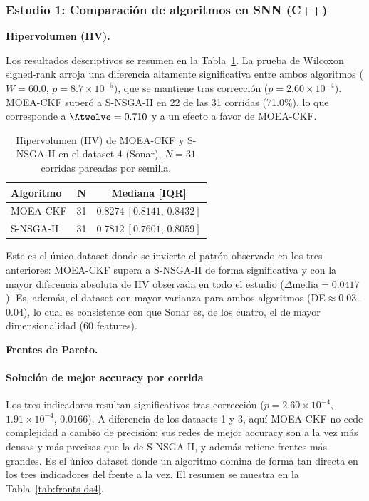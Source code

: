 \subsubsection{Estudio 1: Comparación de algoritmos en SNN (C++)}
\label{sec:ds4-estudio1}

\textbf{Hipervolumen (HV).}\label{sec:ds4-hv}

Los resultados descriptivos se resumen en la Tabla~\ref{tab:hv-ds4}. La prueba de Wilcoxon signed-rank arroja una diferencia altamente significativa entre ambos algoritmos ($W=60.0$, $p=8.7\times10^{-5}$), que se mantiene tras corrección ($p=2.60\times10^{-4}$). MOEA-CKF superó a S-NSGA-II en 22 de las 31 corridas (71.0\%), lo que corresponde a $\Atwelve=0.710$ y a un efecto a favor de MOEA-CKF.

\begin{table}[htbp]
\centering
\small
\caption{Hipervolumen (HV) de MOEA-CKF y S-NSGA-II en el dataset 4 (Sonar), $N=31$ corridas pareadas por semilla.}
\label{tab:hv-ds4}
\begin{tabular}{lcc}
\toprule
\textbf{Algoritmo} & \textbf{N} & \textbf{Mediana [IQR]} \\
\midrule
MOEA-CKF & 31 & $0.8274\ [0.8141,\,0.8432]$ \\
S-NSGA-II & 31 & $0.7812\ [0.7601,\,0.8059]$ \\
\bottomrule
\end{tabular}
\end{table}

Este es el único dataset donde se invierte el patrón observado en los tres anteriores: MOEA-CKF supera a S-NSGA-II de forma significativa y con la mayor diferencia absoluta de HV observada en todo el estudio ($\Delta\text{media}=0.0417$). Es, además, el dataset con mayor varianza para ambos algoritmos (DE$\approx0.03$--$0.04$), lo cual es consistente con que Sonar es, de los cuatro, el de mayor dimensionalidad (60 features).

\textbf{Frentes de Pareto.}\label{sec:ds4-fronts}

\paragraph{Solución de mejor accuracy por corrida} Los tres indicadores resultan significativos tras corrección ($p=2.60\times10^{-4}$, $1.91\times10^{-4}$, $0.0166$). A diferencia de los datasets 1 y 3, aquí MOEA-CKF no cede complejidad a cambio de precisión: sus redes de mejor accuracy son a la vez más densas y más precisas que la de S-NSGA-II, y además retiene frentes más grandes. Es el único dataset donde un algoritmo domina de forma tan directa en los tres indicadores del frente a la vez. El resumen se muestra en la Tabla~\ref{tab:fronts-ds4}.

